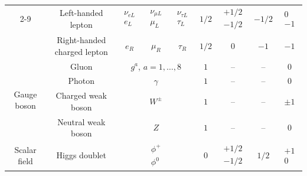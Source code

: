 \begin{table}[htbp]
{\begin{tabular}{ccccccccc}
        \cmidrule(lr){2-9}

        & Left-handed lepton
        & $\begin{array}{c} \nu_{eL} \\ e_{L} \end{array}$
        & $\begin{array}{c} \nu_{\mu L} \\ \mu_{L} \end{array}$
        & $\begin{array}{c} \nu_{\tau L} \\ \tau_{L} \end{array}$
        & $1/2$
        & $\begin{array}{c} +1/2 \\ -1/2 \end{array}$
        & $-1/2$
        & $\begin{array}{c} 0 \\ -1 \end{array}$ \\

        & Right-handed charged lepton
        & $e_{R}$
        & $\mu_{R}$
        & $\tau_{R}$
        & $1/2$
        & $0$
        & $-1$
        & $-1$ \\

        \midrule

        \multirow{4}{*}{Gauge boson}
        & Gluon
        & \multicolumn{3}{c}{$g^{a}$, $a=1,\ldots,8$}
        & $1$
        & --
        & --
        & $0$ \\

        & Photon
        & \multicolumn{3}{c}{$\gamma$}
        & $1$
        & --
        & --
        & $0$ \\

        & Charged weak boson
        & \multicolumn{3}{c}{$W^{\pm}$}
        & $1$
        & --
        & --
        & $\pm1$ \\

        & Neutral weak boson
        & \multicolumn{3}{c}{$Z$}
        & $1$
        & --
        & --
        & $0$ \\

        \midrule

        Scalar field
        & Higgs doublet
        & \multicolumn{3}{c}{
            $\begin{array}{c}
                \phi^{+} \\
                \phi^{0}
            \end{array}$
        }
        & $0$
        & $\begin{array}{c} +1/2 \\ -1/2 \end{array}$
        & $1/2$
        & $\begin{array}{c} +1 \\ 0 \end{array}$ \\

        \bottomrule
    \end{tabular}
    }
\end{table}

